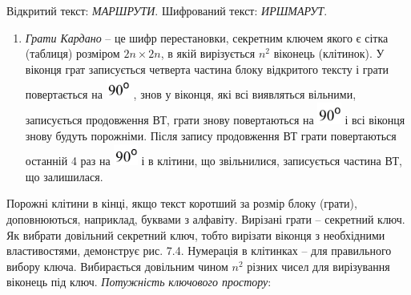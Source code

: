 \documentclass[a4paper]{article}
\newcounter{saveenum}
\newcommand\liststyleWWviiiNumxli{%
\renewcommand\theenumi{\arabic{enumi}}
\renewcommand\theenumii{\alph{enumii}}
\renewcommand\theenumiii{\roman{enumiii}}
\renewcommand\theenumiv{\arabic{enumiv}}
\renewcommand\labelenumi{\theenumi)}
\renewcommand\labelenumii{\theenumii.}
\renewcommand\labelenumiii{\theenumiii.}
\renewcommand\labelenumiv{\theenumiv.}
}
\newcounter{}
\begin{document}
{\centering
Відкритий текст: \textit{МАРШРУТИ}. Шифрований текст: \textit{ИРШМАРУТ}.
\par}


\bigskip

\liststyleWWviiiNumxli
\setcounter{saveenum}{\value{enumi}}
\begin{enumerate}
\setcounter{enumi}{\value{saveenum}}
\item \textit{Грати Кардано} – це шифр перестановки, секретним ключем якого є
сітка (таблиця) розміром  ${2n\times 2n}$,  в якій вирізується  ${n^{{2}}}$
віконець (клітинок). У віконця грат записується четверта частина блоку
відкритого тексту і грати повертається на 
\includegraphics[width=0.3063in,height=0.2819in]{crypt-img/crypt-img72.png} ,
знов у віконця, які всі виявляться вільними, записується продовження  ВТ, грати
знову повертаються на 
\includegraphics[width=0.3063in,height=0.2819in]{crypt-img/crypt-img73.png}  і
всі віконця  знову будуть порожніми. Після запису продовження ВТ грати
повертаються останній 4 раз на 
\includegraphics[width=0.3063in,height=0.2819in]{crypt-img/crypt-img74.png}  і
в клітини, що звільнилися, записується частина ВТ, що залишилася. 
\end{enumerate}
Порожні клітини в кінці, якщо текст коротший за розмір блоку (грати),
доповнюються, наприклад, буквами з алфавіту. Вирізані грати – секретний ключ.
Як вибрати довільний секретний ключ, тобто вирізати віконця з необхідними
властивостями, демонструє рис. 7.4. Нумерація в клітинках – для правильного
вибору ключа. Вибирається довільним чином  ${n^{{2}}}$ різних чисел для
вирізування віконець під ключ. \textit{Потужність} \textit{ключового простору}:
\end{document}
